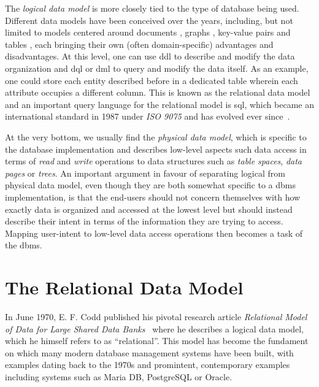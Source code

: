 The \emph{logical data model} is more closely tied to the type of database being used. Different data models have been conceived over the years, including, but not limited to models centered around documents \cite{Hashem:2016Evaluating}, graphs \cite{Angles:2008Survey}, key-value pairs and tables \cite{Codd:1970Relational}, each bringing their own (often domain-specific) advantages and disadvantages. At this level, one can use \acrshort{ddl} to describe and modify the data organization and \acrshort{dql} or \acrshort{dml} to query and modify the data itself. As an example, one could store each entity described before in a dedicated table wherein each attribute occupies a different column. This is known as the relational data model \cite{Codd:1970Relational} and an important query language for the relational model is \acrfull{sql}, which became an international standard in 1987 under \emph{ISO 9075} and has evolved ever since~\cite{Chamberlin:2012Early}.

At the very bottom, we usually find the \emph{physical data model}, which is specific to the database implementation and describes low-level aspects such data access in terms of \emph{read} and \emph{write} operations to data structures such as \emph{table spaces}, \emph{data pages} or \emph{trees}. An important argument in favour of separating logical from physical data model, even though they are both somewhat specific to a \acrshort{dbms} implementation, is that the end-users should not concern themselves with how exactly data is organized and accessed at the lowest level but should instead describe their intent in terms of the information they are trying to access. Mapping user-intent to low-level data access operations then becomes a task of the \acrshort{dbms}.

\section{The Relational Data Model}
\label{section:relational_data_model}

In June 1970, E. F. Codd published his pivotal research article \emph{Relational Model of Data for Large Shared Data Banks}~\cite{Codd:1970Relational} where he describes a logical data model, which he himself refers to as ``relational''. This model has become the fundament on which many modern database management systems have been built, with examples dating back to the 1970s \cite{Astrahan:1976Systemr} and promintent, contemporary examples including systems such as Maria DB, PostgreSQL or Oracle. 

